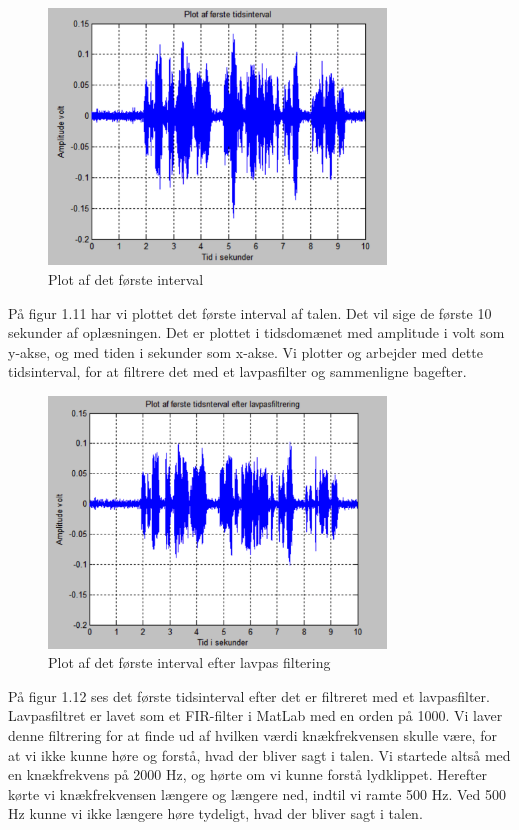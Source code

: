 \begin{figure}[H]
	\centering
	\includegraphics[width=0.8\textwidth]{Figur/Snip20151201_16}
	\caption{Plot af det første interval}
\end{figure}

På figur 1.11 har vi plottet det første interval af talen. Det vil sige de første 10 sekunder af oplæsningen. Det er plottet i tidsdomænet med amplitude i volt som y-akse, og med tiden i sekunder som x-akse. Vi plotter og arbejder med dette tidsinterval, for at filtrere det med et lavpasfilter og sammenligne bagefter. 


\begin{figure}[H]
	\centering
	\includegraphics[width=0.8\textwidth]{Figur/Snip20151201_18}
	\caption{Plot af det første interval efter lavpas filtering}
\end{figure}

På figur 1.12 ses det første tidsinterval efter det er filtreret med et lavpasfilter. Lavpasfiltret er lavet som et FIR-filter i MatLab med en orden på 1000. Vi laver denne filtrering for at finde ud af hvilken værdi knækfrekvensen skulle være, for at vi ikke kunne høre og forstå, hvad der bliver sagt i talen. Vi startede altså med en knækfrekvens på 2000 Hz, og hørte om vi kunne forstå lydklippet. Herefter kørte vi knækfrekvensen længere og længere ned, indtil vi ramte 500 Hz. Ved 500 Hz kunne vi ikke længere høre tydeligt, hvad der bliver sagt i talen.
\\ 
\\ 

